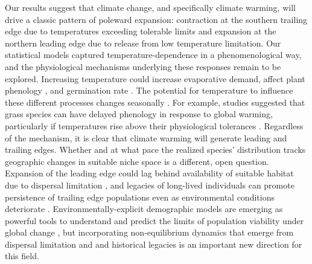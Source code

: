 \documentclass[9pt,twocolumn,twoside,lineno]{pnas-new}
\begin{document}
Our results suggest that climate change, and specifically climate warming, will drive a classic pattern of poleward expansion: contraction at the southern trailing edge due to temperatures exceeding tolerable limits and expansion at the northern leading edge due to release from low temperature limitation. 
Our statistical models captured temperature-dependence in a phenomenological way, and the physiological mechanisms underlying these responses remain to be explored. 
Increasing temperature could increase evaporative demand, affect plant phenology \citep{mclean2016predicting,iler2019reproductive}, and germination rate \citep{reed2021climate}.
The potential for temperature to influence these different processes changes seasonally \citep{konapala2020climate}.
For example, studies suggested that  grass species can have delayed phenology in response to global warming, particularly if temperatures rise above their physiological tolerances \citep{cleland2006diverse}.
Regardless of the mechanism, it is clear that climate warming will generate leading and trailing edges. 
Whether and at what pace the realized species' distribution tracks geographic changes in suitable niche space is a different, open question. 
Expansion of the leading edge could lag behind availability of suitable habitat due to dispersal limitation \citep{pagel2020mismatches}, and legacies of long-lived individuals can promote persistence of trailing edge populations even as environmental conditions deteriorate \citep{margaret2023trailing}. 
Environmentally-explicit demographic models are emerging as powerful tools to understand and predict the limits of population viability under global change \citep{schultz2022climate, merow2017climate}, but incorporating non-equilibrium dynamics that emerge from dispersal limitation and and historical legacies is an important new direction for this field.
\end{document}
